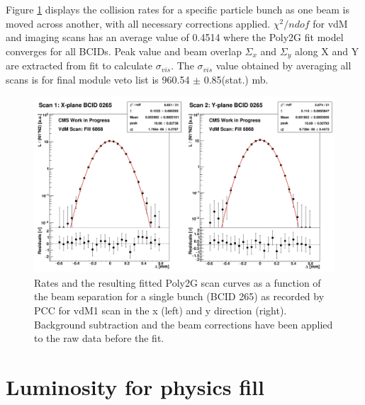 Figure \ref{fig:fitquality} displays the collision rates for a specific particle bunch as one beam is moved across another, with all necessary corrections applied. $\chi^2/ndof$ for vdM and imaging scans has an average value of 0.4514 where the Poly2G fit model converges for all BCIDs. Peak value and beam overlap $\Sigma_x$ and $\Sigma_y$ along X and Y are extracted from fit to calculate $\sigma_{vis}$. %
The $\sigma_{vis}$ value obtained by averaging all scans is for final module veto list is 960.54 $\pm$ 0.85(stat.) mb.

\begin{figure}[!htp]
    \centering
    \includegraphics[width=1\textwidth]{ashish_thesis/vdM_fit_cveto_1.png}
    \caption[PCC Rate Fit]{Rates and the resulting fitted Poly2G scan curves as a function of the beam separation for a single bunch (BCID 265) as recorded by PCC for vdM1 scan in the x (left) and y direction (right). Background subtraction and the beam corrections have been applied to the raw data before the fit.}
    \label{fig:fitquality}
\end{figure}


\newpage
\section{Luminosity for physics fill}

